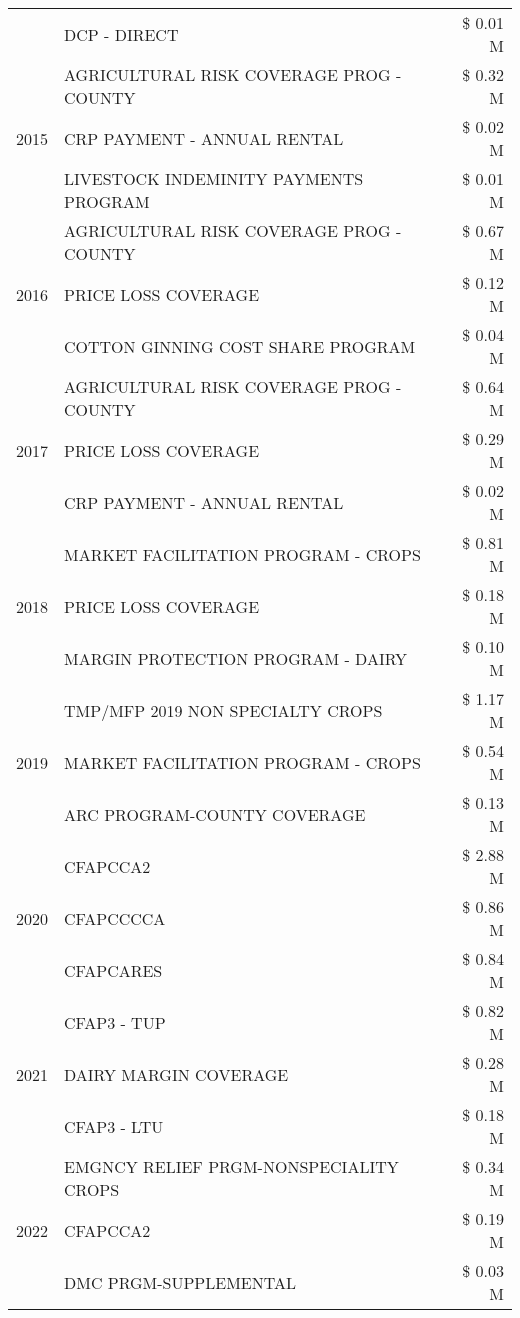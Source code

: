 \begin{tabular}{llr}
 & DCP - DIRECT & \$ 0.01 M \\
\cline{1-3}
\multirow[t]{3}{*}{2015} & AGRICULTURAL RISK COVERAGE PROG - COUNTY & \$ 0.32 M \\
 & CRP PAYMENT - ANNUAL RENTAL & \$ 0.02 M \\
 & LIVESTOCK INDEMINITY PAYMENTS PROGRAM & \$ 0.01 M \\
\cline{1-3}
\multirow[t]{3}{*}{2016} & AGRICULTURAL RISK COVERAGE PROG - COUNTY & \$ 0.67 M \\
 & PRICE LOSS COVERAGE & \$ 0.12 M \\
 & COTTON GINNING COST SHARE PROGRAM & \$ 0.04 M \\
\cline{1-3}
\multirow[t]{3}{*}{2017} & AGRICULTURAL RISK COVERAGE PROG - COUNTY & \$ 0.64 M \\
 & PRICE LOSS COVERAGE & \$ 0.29 M \\
 & CRP PAYMENT - ANNUAL RENTAL & \$ 0.02 M \\
\cline{1-3}
\multirow[t]{3}{*}{2018} & MARKET FACILITATION PROGRAM - CROPS & \$ 0.81 M \\
 & PRICE LOSS COVERAGE & \$ 0.18 M \\
 & MARGIN PROTECTION PROGRAM - DAIRY & \$ 0.10 M \\
\cline{1-3}
\multirow[t]{3}{*}{2019} & TMP/MFP 2019 NON SPECIALTY CROPS & \$ 1.17 M \\
 & MARKET FACILITATION PROGRAM - CROPS & \$ 0.54 M \\
 & ARC PROGRAM-COUNTY COVERAGE & \$ 0.13 M \\
\cline{1-3}
\multirow[t]{3}{*}{2020} & CFAPCCA2 & \$ 2.88 M \\
 & CFAPCCCCA & \$ 0.86 M \\
 & CFAPCARES & \$ 0.84 M \\
\cline{1-3}
\multirow[t]{3}{*}{2021} & CFAP3 - TUP & \$ 0.82 M \\
 & DAIRY MARGIN COVERAGE & \$ 0.28 M \\
 & CFAP3 - LTU & \$ 0.18 M \\
\cline{1-3}
\multirow[t]{3}{*}{2022} & EMGNCY RELIEF PRGM-NONSPECIALITY CROPS & \$ 0.34 M \\
 & CFAPCCA2 & \$ 0.19 M \\
 & DMC PRGM-SUPPLEMENTAL & \$ 0.03 M \\
\cline{1-3}
\bottomrule
\end{tabular}

